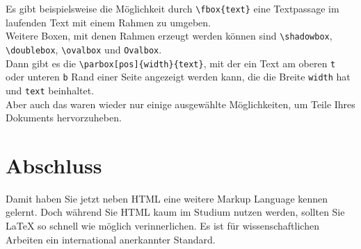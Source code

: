 Es gibt beispielsweise die Möglichkeit durch \verb|\fbox{text}| eine Textpassage im laufenden Text mit einem Rahmen zu umgeben.\\

Weitere Boxen, mit denen Rahmen erzeugt werden können sind \verb|\shadowbox|, \verb|\doublebox|, \verb|\ovalbox| und \verb|Ovalbox|.\\

Dann gibt es die \verb|\parbox[pos]{width}{text}|, mit der ein Text am oberen \verb|t| oder unteren \verb|b| Rand einer Seite angezeigt werden kann, die die Breite \verb|width| hat und \verb|text| beinhaltet.\\

Aber auch das waren wieder nur einige ausgewählte Möglichkeiten, um Teile Ihres Dokuments hervorzuheben.

\section{Abschluss}

Damit haben Sie jetzt neben HTML eine weitere Markup Language kennen gelernt. Doch während Sie HTML kaum im Studium nutzen werden, sollten Sie LaTeX so schnell wie möglich verinnerlichen. Es ist für wissenschaftlichen Arbeiten ein international anerkannter Standard.